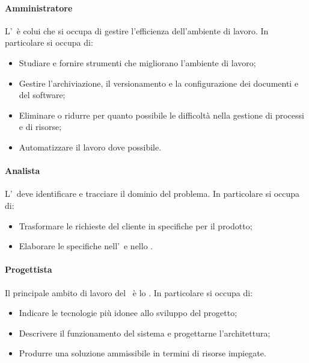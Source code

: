 \documentclass[../NormeDiProgetto.tex]{subfiles}
\begin{document}
				\paragraph{Amministratore\\}
					L'\amministratore\ è colui che si occupa di gestire l'efficienza dell'ambiente
					di lavoro. In particolare si occupa di:
					\begin{itemize}
						\item Studiare e fornire strumenti che migliorano l'ambiente di lavoro;
						\item Gestire l'archiviazione, il versionamento e la configurazione dei
						documenti e del software;
						\item Eliminare o ridurre per quanto possibile le difficoltà nella gestione
						di processi e di risorse;
						\item Automatizzare il lavoro dove possibile.
					\end{itemize}
				\paragraph{Analista\\}
					L'\analista\ deve identificare e tracciare il dominio del problema.
					In particolare si occupa di:
					\begin{itemize}
						\item Trasformare le richieste del cliente in specifiche per il prodotto;
						\item Elaborare le specifiche nell'\analisideirequisiti\ e nello
						\studiodifattibilita.
					\end{itemize} 
				\paragraph{Progettista\\}
					Il principale ambito di lavoro del \progettista\ è lo .
					In particolare si occupa di:
					\begin{itemize}
						\item Indicare le tecnologie più idonee allo sviluppo del progetto;
						\item Descrivere il funzionamento del sistema e progettarne l'architettura;
						\item Produrre una soluzione ammissibile in termini di risorse impiegate.
					\end{itemize}	
\end{document}
